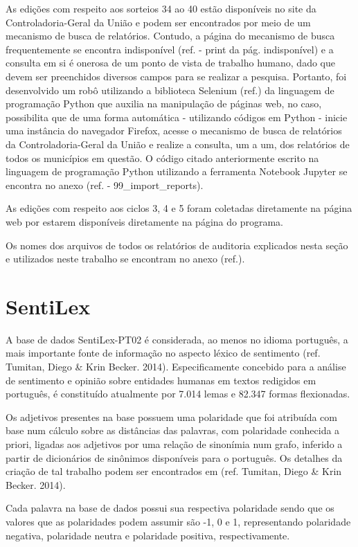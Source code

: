 As edições com respeito aos sorteios 34 ao 40 estão disponíveis no site da Controladoria-Geral da União e podem ser encontrados por meio de um mecanismo de busca de relatórios. Contudo, a página do mecanismo de busca frequentemente se encontra indisponível (ref. - print da pág. indisponível) e a consulta em si é onerosa de um ponto de vista de trabalho humano, dado que devem ser preenchidos diversos campos para se realizar a pesquisa. Portanto, foi desenvolvido um robô utilizando a biblioteca Selenium (ref.) da linguagem de programação Python que auxilia na manipulação de páginas web, no caso, possibilita que de uma forma automática - utilizando códigos em Python - inicie uma instância do navegador Firefox, acesse o mecanismo de busca de relatórios da Controladoria-Geral da União e realize a consulta, um a um, dos relatórios de todos os municípios em questão. O código citado anteriormente escrito na linguagem de programação Python utilizando a ferramenta Notebook Jupyter se encontra no anexo (ref. - 99_import_reports).

As edições com respeito aos ciclos 3, 4 e 5 foram coletadas diretamente na página web por estarem disponíveis diretamente na página do programa.

Os nomes dos arquivos de todos os relatórios de auditoria explicados nesta seção e utilizados neste trabalho se encontram no anexo (ref.).

\section{SentiLex}
\label{sec:sentilex}

A base de dados SentiLex-PT02 é considerada, ao menos no idioma português, a mais importante fonte de informação no aspecto léxico de sentimento \citep{BeckerTumitan2014} (ref. Tumitan, Diego \& Krin Becker. 2014). Especificamente concebido para a análise de sentimento e opinião sobre entidades humanas em textos redigidos em português, é constituído atualmente por 7.014 lemas e 82.347 formas flexionadas.

Os adjetivos presentes na base possuem uma polaridade que foi atribuída com base num cálculo sobre as distâncias das palavras, com polaridade conhecida a priori, ligadas aos adjetivos por uma relação de sinonímia num grafo, inferido a partir de dicionários de sinônimos disponíveis para o português. Os detalhes da criação de tal trabalho podem ser encontrados em (ref. Tumitan, Diego \& Krin Becker. 2014).

Cada palavra na base de dados possui sua respectiva polaridade sendo que os valores que as polaridades podem assumir são -1, 0 e 1, representando polaridade negativa, polaridade neutra e polaridade positiva, respectivamente.

